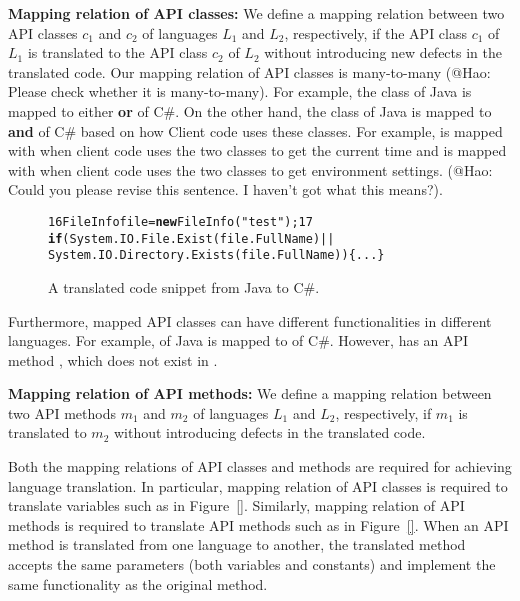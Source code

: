\textbf{Mapping relation of API classes:} We define a mapping relation between
two API classes $c_1$ and $c_2$ of languages $L_1$ and $L_2$, respectively,
if the API class $c_1$ of $L_1$ is translated to the API class $c_2$ of $L_2$
without introducing new defects in the translated code. Our mapping
relation of API classes is many-to-many (@Hao: Please check whether it is many-to-many). For example,
the  class of Java is mapped to either
 \textbf{or}  of C\#.
On the other hand, the  class of Java is mapped
to  \textbf{and}  of C\#
based on how Client code uses these classes. For example,
 is mapped with 
when client code uses the two classes to get the current time and is
mapped with  when client code uses the
two classes to get environment settings. (@Hao: Could you please revise
this sentence. I haven't got what this means?).
\begin{figure}[t]
\begin{CodeOut}\vspace*{-1ex}
\begin{alltt}
16  FileInfo file = \textbf{new} FileInfo("test"); 17
\textbf{if}(System.IO.File.Exist(file.FullName)||
       System.IO.Directory.Exists(file.FullName))\{...\}
\end{alltt}
\end{CodeOut}\vspace*{-4ex}
\caption{\label{fig:translatedcode} A translated code snippet from
Java to C\#.}\vspace*{-3ex}
\end{figure}

Furthermore, mapped API classes can have different functionalities
in different languages. For example,  of
Java is mapped to  of C\#. However,
 has an API method , which does
not exist in .

\textbf{Mapping relation of API methods:} We define a mapping relation
between two API methods $m_1$ and $m_2$ of languages $L_1$ and $L_2$,
respectively, if $m_1$ is translated to $m_2$ without introducing defects
in the translated code.

Both the mapping relations of API classes and methods are required for
achieving language translation. In particular, mapping relation of API classes is
required to translate variables such as  in Figure~\ref{}.
Similarly, mapping relation of API methods is
required to translate API methods such as  in Figure~\ref{}.
When an API method is translated from one language to another, the translated
method accepts the same parameters (both variables and constants) and implement
the same functionality as the original method.

